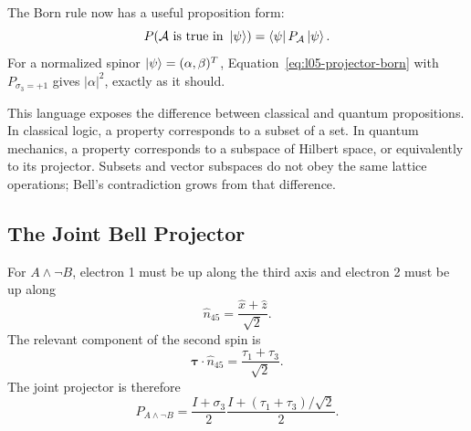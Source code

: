 \begin{classroomqa}
\end{classroomqa}

The Born rule now has a useful proposition form:
\begin{equation}
  P(\mathcal A\text{ is true in }\left\lvert\psi\right\rangle)
  =
  \left\langle\psi\right\rvert P_{\mathcal A}\left\lvert\psi\right\rangle.
  \label{eq:l05-projector-born}
\end{equation}
For a normalized spinor \(\left\lvert\psi\right\rangle=(\alpha,\beta)^T\), Equation~\eqref{eq:l05-projector-born} with \(P_{\sigma_3=+1}\) gives \(|\alpha|^2\), exactly as it should.

This language exposes the difference between classical and quantum propositions. In classical logic, a property corresponds to a subset of a set. In quantum mechanics, a property corresponds to a subspace of Hilbert space, or equivalently to its projector. Subsets and vector subspaces do not obey the same lattice operations; Bell's contradiction grows from that difference.

\subsection{The Joint Bell Projector}

For \(A\wedge\neg B\), electron 1 must be up along the third axis and electron 2 must be up along
\begin{equation}
  \hat n_{45}=\frac{\hat x+\hat z}{\sqrt2}.
\end{equation}
The relevant component of the second spin is
\begin{equation}
  \boldsymbol{\tau}\cdot\hat n_{45}
  =
  \frac{\tau_1+\tau_3}{\sqrt2}.
\end{equation}
The joint projector is therefore
\begin{equation}
  P_{A\wedge\neg B}
  =
  \frac{I+\sigma_3}{2}
  \frac{I+(\tau_1+\tau_3)/\sqrt2}{2}.
  \label{eq:l05-joint-projector}
\end{equation}

\begin{classroomqa}
\end{classroomqa}

